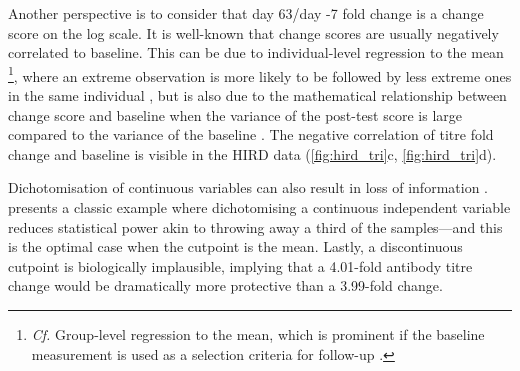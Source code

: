 Another perspective is to consider that day 63/day -7 fold change is a change score on the log scale.
It is well-known that change scores are usually negatively correlated to baseline.
This can be due to individual-level regression to the mean%
\footnote{
    \textit{Cf.} Group-level regression to the mean, which is prominent if the baseline measurement is used as a selection criteria for follow-up \autocite{barnett2004RegressionMeanWhat,senn2011FrancisGaltonRegression}.
}, 
where an extreme observation is more likely to be followed by less extreme ones in the same individual \autocite{barnett2004RegressionMeanWhat},
but is also due to the mathematical relationship between change score and baseline when the variance of the post-test score is large compared to the variance of the baseline \autocite{clifton2019CorrelationBaselineScore}.
The negative correlation of titre fold change and baseline is visible in the \gls{HIRD} data (\cref{fig:hird_tri}c, \cref{fig:hird_tri}d).

Dichotomisation of continuous variables can also result in loss of information \autocite{cohen1983CostDichotomization,senn2005DichotomaniaObsessiveCompulsive,altman2006CostDichotomisingContinuous,fedorov2009ConsequencesDichotomization}.
\textcite{cohen1983CostDichotomization} presents a classic example where 
dichotomising a continuous independent variable reduces statistical power akin to throwing away a third of the samples---and this is the optimal case when the cutpoint is the mean.
Lastly, a discontinuous cutpoint is biologically implausible, implying that a 4.01-fold antibody titre change would be dramatically more protective than a 3.99-fold change.


